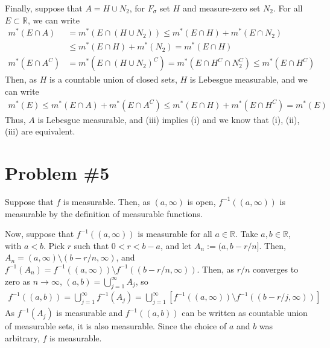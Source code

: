 \documentclass{scrartcl}
\begin{document}
Finally, suppose that \(A = H \cup N_2\), for \(F_\sigma\) set \(H\) and
measure-zero set \(N_2\). For all \(E \subset \mathbb{R}\), we can write
\begin{align*}
  m^*(E \cap A)
  &= m^*(E \cap (H \cup N_2))
  \le m^*(E \cap H) + m^*(E \cap N_2) \\
  &\le m^*(E \cap H) + m^*(N_2)
  = m^*(E \cap H) \\
  m^*(E \cap A^C)
  &= m^*(E \cap (H \cup N_2)^C)
  = m^*(E \cap H^C \cap N^C_2)
  \le m^*(E \cap H^C)
\end{align*}
Then, as \(H\) is a countable union of closed sets, \(H\) is Lebesgue
measurable, and we can write
\begin{align*}
  m^*(E)
  \le m^*(E \cap A) + m^*(E \cap A^C)
  \le m^*(E \cap H) + m^*(E \cap H^C)
  = m^*(E)
\end{align*}
Thus, \(A\) is Lebesgue measurable, and (iii) implies (i) and we know that (i),
(ii), (iii) are equivalent.

\section{Problem \#5}
Suppose that \(f\) is measurable. Then, as \((a, \infty)\) is open,
\(f^{-1}((a, \infty))\) is measurable by the definition of measurable
functions.

Now, suppose that \(f^{-1}((a, \infty))\) is measurable for all \(a \in
\mathbb{R}\). Take \(a, b \in \mathbb{R}\), with \(a < b\). Pick \(r\) such
that \(0 < r < b - a\), and let \(A_n := (a, b - r/n]\). Then, \(A_n = (a,
\infty) \setminus (b - r/n, \infty)\), and \(f^{-1}(A_n) = f^{-1}((a, \infty))
\setminus f^{-1}((b - r/n, \infty))\). Then, as \(r / n\) converges to zero as
\(n \to \infty\), \((a, b) = \bigcup^\infty_{j = 1} A_j\), so
\begin{align*}
  f^{-1}((a, b))
  = \bigcup^\infty_{j = 1} f^{-1}(A_j)
  = \bigcup^\infty_{j = 1} [f^{-1}((a, \infty))
    \setminus f^{-1}((b - r/j, \infty))]
\end{align*}
As \(f^{-1}(A_j)\) is measurable and \(f^{-1}((a, b))\) can be written as
countable union of measurable sets, it is also measurable. Since the choice of
\(a\) and \(b\) was arbitrary, \(f\) is measurable.
\end{document}
